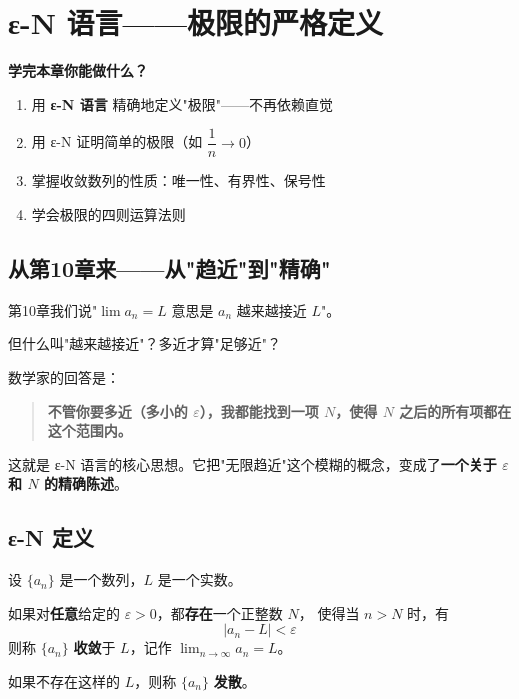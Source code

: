
\chapter{ε-N 语言——极限的严格定义}

\begin{applicationbox}
\textbf{学完本章你能做什么？}
\begin{enumerate}
  \item 用 \textbf{ε-N 语言} 精确地定义"极限"——不再依赖直觉
  \item 用 ε-N 证明简单的极限（如 \(\dfrac{1}{n} \to 0\)）
  \item 掌握收敛数列的性质：唯一性、有界性、保号性
  \item 学会极限的四则运算法则
\end{enumerate}
\end{applicationbox}


\section{从第10章来——从"趋近"到"精确"}

第10章我们说"\(\lim a_n = L\) 意思是 \(a_n\) 越来越接近 \(L\)"。

但什么叫"越来越接近"？多近才算"足够近"？

数学家的回答是：

\begin{quote}
\textbf{不管你要多近（多小的 \(\varepsilon\)），我都能找到一项 \(N\)，使得 \(N\) 之后的所有项都在这个范围内。}
\end{quote}

这就是 ε-N 语言的核心思想。它把"无限趋近"这个模糊的概念，变成了\textbf{一个关于 \(\varepsilon\) 和 \(N\) 的精确陈述}。


\section{ε-N 定义}

\begin{definitionbox}[数列极限的 ε-N 定义]
设 \(\{a_n\}\) 是一个数列，\(L\) 是一个实数。

如果对\textbf{任意}给定的 \(\varepsilon > 0\)，都\textbf{存在}一个正整数 \(N\)，
使得当 \(n > N\) 时，有
\[
|a_n - L| < \varepsilon
\]
则称 \(\{a_n\}\) \textbf{收敛}于 \(L\)，记作 \(\displaystyle \lim_{n \to \infty} a_n = L\)。

如果不存在这样的 \(L\)，则称 \(\{a_n\}\) \textbf{发散}。
\end{definitionbox}

